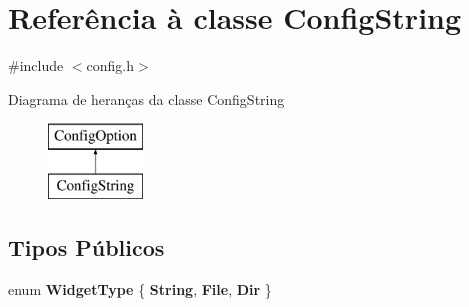 \hypertarget{class_config_string}{\section{Referência à classe Config\-String}
\label{class_config_string}
}


{\ttfamily \#include $<$config.\-h$>$}

Diagrama de heranças da classe Config\-String\begin{figure}[H]
\begin{center}
\leavevmode
\includegraphics[height=2.000000cm]{class_config_string}
\end{center}
\end{figure}
\subsection*{Tipos Públicos}
\begin{DoxyCompactItemize}
\item 
enum {\bfseries Widget\-Type} \{ {\bfseries String}, 
{\bfseries File}, 
{\bfseries Dir}
 \}
\end{DoxyCompactItemize}
